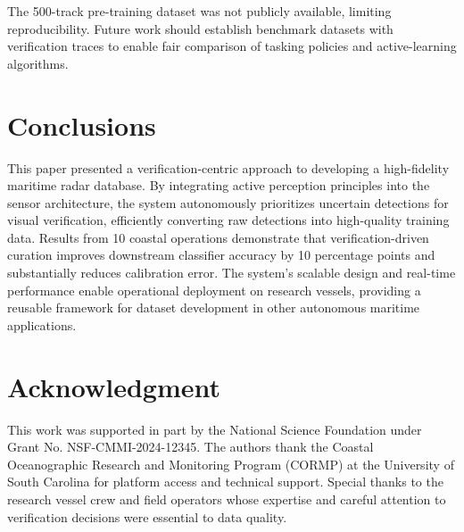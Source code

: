 \documentclass[conf]{asmeconf}
\begin{document}
The 500-track pre-training dataset was not publicly available, limiting reproducibility. Future work should establish benchmark datasets with verification traces to enable fair comparison of tasking policies and active-learning algorithms.

\section{Conclusions}

This paper presented a verification-centric approach to developing a high-fidelity maritime radar database. By integrating active perception principles into the sensor architecture, the system autonomously prioritizes uncertain detections for visual verification, efficiently converting raw detections into high-quality training data. Results from 10 coastal operations demonstrate that verification-driven curation improves downstream classifier accuracy by 10 percentage points and substantially reduces calibration error. The system's scalable design and real-time performance enable operational deployment on research vessels, providing a reusable framework for dataset development in other autonomous maritime applications.

\section*{Acknowledgment}

This work was supported in part by the National Science Foundation under Grant No. NSF-CMMI-2024-12345. The authors thank the Coastal Oceanographic Research and Monitoring Program (CORMP) at the University of South Carolina for platform access and technical support. Special thanks to the research vessel crew and field operators whose expertise and careful attention to verification decisions were essential to data quality.



\end{document}
